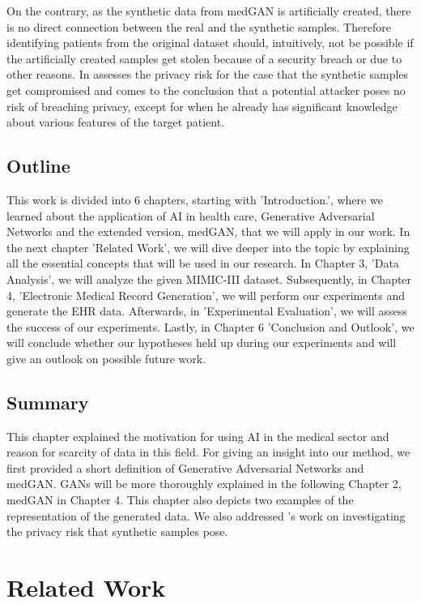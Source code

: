 \documentclass[11pt, a4paper]{book}
\begin{document}
On the contrary, as the synthetic data from medGAN is artificially created, there is no direct connection between the real and the synthetic samples. Therefore identifying patients from the original dataset should, intuitively, not be possible if the artificially created samples get stolen because of a security breach or due to other reasons. In \cite{Choi2017} assesses the privacy risk for the case that the synthetic samples get compromised and comes to the conclusion that a potential attacker poses no risk of breaching privacy, except for when he already has significant knowledge about various features of the target patient.

\section{Outline}
This work is divided into 6 chapters, starting with 'Introduction.', where we learned about the application of AI in health care, Generative Adversarial Networks and the extended version, medGAN, that we will apply in our work. In the next chapter 'Related Work', we will dive deeper into the topic by explaining all the essential concepts that will be used in our research. In Chapter 3,  'Data Analysis', we will analyze the given MIMIC-III dataset. Subsequently, in Chapter 4, 'Electronic Medical Record Generation', we will perform our experiments and generate the EHR data. Afterwards, in 'Experimental Evaluation', we will assess the success of our experiments. Lastly, in Chapter 6 'Conclusion and Outlook', we will conclude whether our hypotheses held up during our experiments and will give an outlook on possible future work.

\section{Summary}
This chapter explained the motivation for using AI in the medical sector and reason for scarcity of data in this field. For giving an insight into our method, we first provided a short definition of Generative Adversarial Networks and medGAN. GANs will be more thoroughly explained in the following Chapter 2, medGAN in Chapter 4. This chapter also depicts two examples of the representation of the generated data. We also addressed \cite{Choi2017}'s work on investigating the privacy risk that synthetic samples pose.

\chapter{Related Work}
\end{document}
